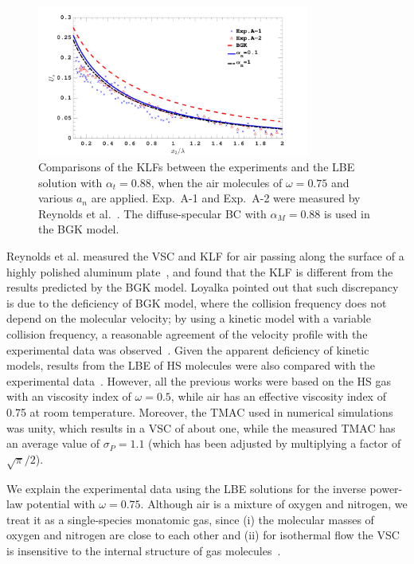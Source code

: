 \begin{figure}[t]
	\begin{centering}
		\includegraphics[width=0.8\textwidth]{SlipJump/IMG/com_exp_at088_new}
		\par\end{centering}
	\caption{ Comparisons of the KLFs between the experiments and the LBE solution with $\alpha_t=0.88$, when the air molecules of $\omega=0.75$ and various $a_n$ are applied. Exp.~A-1 and Exp.~A-2 were measured by Reynolds et al.~\cite{reynolds1974velocity}. The diffuse-specular BC with $\alpha_M=0.88$ is used in the BGK model. }
	\label{fig:com_exp}
\end{figure}


Reynolds et al. measured the VSC and KLF for air passing along the surface of a highly polished aluminum plate~\cite{reynolds1974velocity}, and found that the KLF is different from the results predicted by the BGK model. Loyalka pointed out that such discrepancy is due to the deficiency of BGK model, where the collision frequency does not depend on the molecular velocity; by using a kinetic model with a variable collision frequency, a reasonable agreement of the velocity profile with the experimental data was observed~\cite{loyalka1975velocity}. Given the apparent deficiency of kinetic models, results from the LBE of HS molecules were also compared with the experimental data~\cite{ohwada1989numerical}. However, all the previous works were based on the HS gas with an viscosity index of $\omega=0.5$, while air has an effective viscosity index of 0.75 at room temperature. Moreover, the TMAC used in numerical simulations was unity, which results in a VSC of about one, while the measured TMAC has an average value of $\sigma_P=1.1$ (which has been adjusted by multiplying a factor of $\sqrt{\pi}/2$).


We explain the experimental data using the LBE solutions for the inverse power-law potential with $\omega=0.75$. Although air is a mixture of oxygen and nitrogen, we treat it as a single-species monatomic gas, since (i) the molecular masses of oxygen and nitrogen are close to each other and (ii) for isothermal flow the VSC is insensitive to the internal structure of gas molecules~\cite{LeiJFM2015,Loyalka1979Polyatomic}. 



